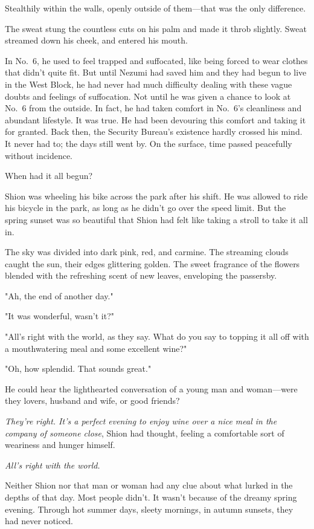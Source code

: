 Stealthily within the walls, openly outside of them---that was the only
difference.

The sweat stung the countless cuts on his palm and made it throb
slightly. Sweat streamed down his cheek, and entered his mouth.

In No.~6, he used to feel trapped and suffocated, like being forced to
wear clothes that didn't quite fit. But until Nezumi had saved him and
they had begun to live in the West Block, he had never had much
difficulty dealing with these vague doubts and feelings of suffocation.
Not until he was given a chance to look at No.~6 from the outside. In
fact, he had taken comfort in No.~6's cleanliness and abundant
lifestyle. It was true. He had been devouring this comfort and taking it
for granted. Back then, the Security Bureau's existence hardly crossed
his mind. It never had to; the days still went by. On the surface, time
passed peacefully without incidence.

When had it all begun?

Shion was wheeling his bike across the park after his shift. He was
allowed to ride his bicycle in the park, as long as he didn't go over
the speed limit. But the spring sunset was so beautiful that Shion had
felt like taking a stroll to take it all in.

The sky was divided into dark pink, red, and carmine. The streaming
clouds caught the sun, their edges glittering golden. The sweet
fragrance of the flowers blended with the refreshing scent of new
leaves, enveloping the passersby.

"Ah, the end of another day."

"It was wonderful, wasn't it?"

"All's right with the world, as they say. What do you say to topping it
all off with a mouthwatering meal and some excellent wine?"

"Oh, how splendid. That sounds great."

He could hear the lighthearted conversation of a young man and
woman---were they lovers, husband and wife, or good friends?

\emph{They're right. It's a perfect evening to enjoy wine over a nice meal in
the company of someone close}, Shion had thought, feeling a comfortable
sort of weariness and hunger himself.

\emph{All's right with the world.}

Neither Shion nor that man or woman had any clue about what lurked in
the depths of that day. Most people didn't. It wasn't because of the
dreamy spring evening. Through hot summer days, sleety mornings, in
autumn sunsets, they had never noticed.

